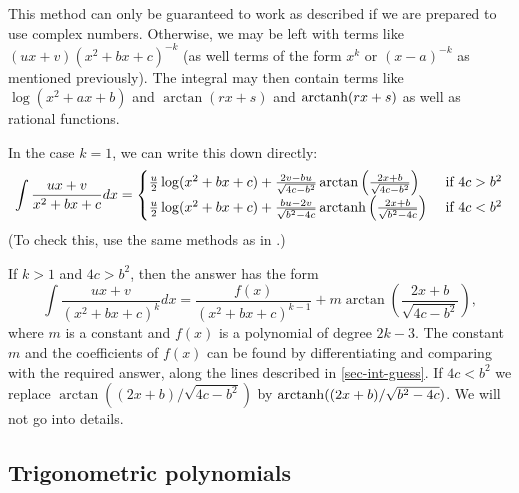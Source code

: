 \documentclass[a4paper]{book}
\theoremstyle{definition}
\begin{document}
This method can only be guaranteed to work as described if we are
prepared to use complex numbers.  Otherwise, we may be left with terms
like $(ux+v)(x^2+bx+c)^{-k}$ (as well terms of the form $x^k$ or
$(x-a)^{-k}$ as mentioned previously).  The integral may then contain
terms like $\log(x^2+ax+b)$ and $\arctan(rx+s)$ and $\operatorname{arctanh}(rx+s)$
as well as rational functions.

In the case $k=1$, we can write this down directly:
\[ \int \frac{ux+v}{x^2+bx+c} dx = 
  \begin{cases} \frac{u}{2}\log(x^2+bx+c) + 
                \frac{2v-bu}{\sqrt{4c-b^2}}
                \arctan\left(\frac{2x+b}{\sqrt{4c-b^2}}\right) &
                 \text{ if } 4c > b^2 \\
                \frac{u}{2}\log(x^2+bx+c) + 
                \frac{bu-2v}{\sqrt{b^2-4c}}
                \operatorname{arctanh}\left(\frac{2x+b}{\sqrt{b^2-4c}}\right) &
                 \text{ if } 4c < b^2
  \end{cases} 
\]
(To check this, use the same methods as in .)

If $k>1$ and $4c>b^2$, then the answer has the form
\[ \int\frac{ux+v}{(x^2+bx+c)^k} dx = 
    \frac{f(x)}{(x^2+bx+c)^{k-1}} + 
    m \arctan\left(\frac{2x+b}{\sqrt{4c-b^2}}\right),
\]
where $m$ is a constant and $f(x)$ is a polynomial of degree $2k-3$.
The constant $m$ and the coefficients of $f(x)$ can be found by
differentiating and comparing with the required answer, along the
lines described in \autoref{sec-int-guess}.  If $4c<b^2$ we
replace $\arctan((2x+b)/\sqrt{4c-b^2})$ by
$\operatorname{arctanh}((2x+b)/\sqrt{b^2-4c})$.  We will not go into details. 

\subsection{Trigonometric polynomials}
\end{document}
